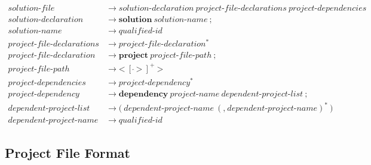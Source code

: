 \documentclass[a4paper,oneside,11pt]{article}
\begin{document}
\begin{align*}
solution\textrm{-}file &\rightarrow solution\textrm{-}declaration \> project\textrm{-}file\textrm{-}declarations \> project\textrm{-}dependencies\\
solution\textrm{-}declaration &\rightarrow \textbf{solution} \> solution\textrm{-}name \> \texttt{;}\\
solution\textrm{-}name &\rightarrow \hyperref[qualifiedid]{qualified\textrm{-}id}\\
project\textrm{-}file\textrm{-}declarations &\rightarrow project\textrm{-}file\textrm{-}declaration^*\\
project\textrm{-}file\textrm{-}declaration &\rightarrow \textbf{project} \> project\textrm{-}file\textrm{-}path \> \texttt{;}\\
project\textrm{-}file\textrm{-}path &\rightarrow \texttt{<} \> [\> \hat{}\,\texttt{>}\>]^+ \> \texttt{>}\\
project\textrm{-}dependencies &\rightarrow project\textrm{-}dependency^*\\
project\textrm{-}dependency &\rightarrow \textbf{dependency} \> project\textrm{-}name \> dependent\textrm{-}project\textrm{-}list \> \texttt{;}\\
dependent\textrm{-}project\textrm{-}list &\rightarrow \texttt{(} \> dependent\textrm{-}project\textrm{-}name \> (\texttt{,} \>
dependent\textrm{-}project\textrm{-}name)^* \> \texttt{)}\\
dependent\textrm{-}project\textrm{-}name &\rightarrow \hyperref[qualifiedid]{qualified\textrm{-}id}
\end{align*}

\subsection{Project File Format}
\end{document}
